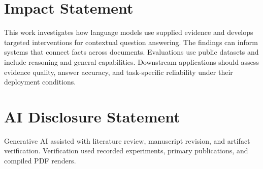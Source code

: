 \documentclass{article}
\begin{document}
\section*{Impact Statement}
This work investigates how language models use supplied evidence and develops targeted interventions for contextual question answering. The findings can inform systems that connect facts across documents. Evaluations use public datasets and include reasoning and general capabilities. Downstream applications should assess evidence quality, answer accuracy, and task-specific reliability under their deployment conditions.
\section*{AI Disclosure Statement}
Generative AI assisted with literature review, manuscript revision, and artifact verification. Verification used recorded experiments, primary publications, and compiled PDF renders.
\clearpage\nobalance

\clearpage
\nobalance\appendix\onecolumn\flushbottom
\setlength{\textfloatsep}{12pt plus 2pt minus 2pt}
\setlength{\intextsep}{8pt plus 2pt minus 1pt}
\setlength{\floatsep}{10pt plus 2pt minus 1pt}
\renewcommand{\floatpagefraction}{.85}
\renewcommand{\textfraction}{.08}
\renewcommand{\topfraction}{.95}
\renewcommand{\bottomfraction}{.9}
\setcounter{figure}{0}\setcounter{table}{0}
\renewcommand{\theHfigure}{A.\arabic{figure}}
\renewcommand{\theHtable}{A.\arabic{table}}



\end{document}

